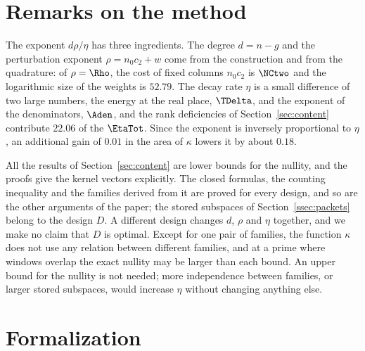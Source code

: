 \section{Remarks on the method}\label{sec:remarks}

The exponent $d\rho/\eta$ has three ingredients. The degree $d=n-g$ and the perturbation exponent
$\rho=n_0c_2+w$ come from the construction and from the quadrature: of $\rho=\Rho$, the cost of fixed
columns $n_0c_2$ is $\NCtwo$ and the logarithmic size of the weights is $52.79$. The decay rate $\eta$ is
a small difference of two large numbers, the energy at the real place, $\TDelta$, and the exponent of the
denominators, $\Aden$, and the rank deficiencies of Section~\ref{sec:content} contribute $22.06$ of the
$\EtaTot$. Since the exponent is inversely proportional to $\eta$, an additional gain of $0.01$ in the area
of $\kappa$ lowers it by about $0.18$.

All the results of Section~\ref{sec:content} are lower bounds for the nullity, and the proofs give the
kernel vectors explicitly. The closed formulas, the counting inequality and the families derived from it are
proved for every design, and so are the other arguments of the paper; the stored subspaces of
Section~\ref{ssec:packets} belong to the design $D$. A different design changes $d$, $\rho$ and $\eta$
together, and we make no claim that $D$ is optimal. Except for one pair of families, the function $\kappa$
does not use any relation between different families, and at a prime where windows overlap the exact
nullity may be larger than each bound. An upper bound for the nullity is not needed; more independence
between families, or larger stored subspaces, would increase $\eta$ without changing anything else.

\section{Formalization}\label{sec:formal}

